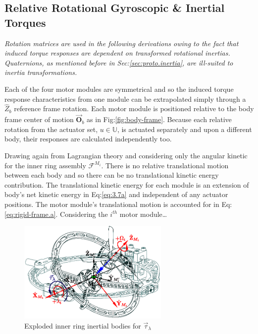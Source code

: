 \subsection{Relative Rotational Gyroscopic \& Inertial Torques}
\label{subsec:dynamics.nonlinearities.gyrotorques}
\emph{\color{gray}Rotation matrices are used in the following derivations owing to the fact that induced torque responses are dependent on transformed rotational inertias. Quaternions, as mentioned before in Sec:\ref{sec:proto.inertia}, are ill-suited to inertia transformations.}
\par
Each of the four motor modules are symmetrical and so the induced torque response characteristics from one module can be extrapolated simply through a $\hat{Z}_b$ reference frame rotation. Each motor module is positioned relative to the body frame center of motion $\vec{\mathbf{O}}_b$ as in Fig:\ref{fig:body-frame}. Because each relative rotation from the actuator set, $u\in\mathbb{U}$, is actuated separately and upon a different body, their responses are calculated independently too.
\par
Drawing again from Lagrangian theory and considering only the angular kinetic for the inner ring assembly $\mathcal{F}^{M_i}$. There is no relative translational motion between each body and so there can be no translational kinetic energy contribution. The translational kinetic energy for each module is an extension of body's net kinetic energy in Eq:\ref{eq:3.7a} and independent of any actuator positions. The motor module's translational motion is accounted for in Eq:\ref{eq:rigid-frame.a}. Considering the $i^{th}$ motor module\ldots
\begin{figure}[htbp]
\centering
\includegraphics[width=0.65\textwidth]{figs/response-inner}
\caption{Exploded inner ring inertial bodies for $\vec{\tau}_\lambda$}
\label{fig:response-inner}
\vspace{-12pt}
\end{figure}
